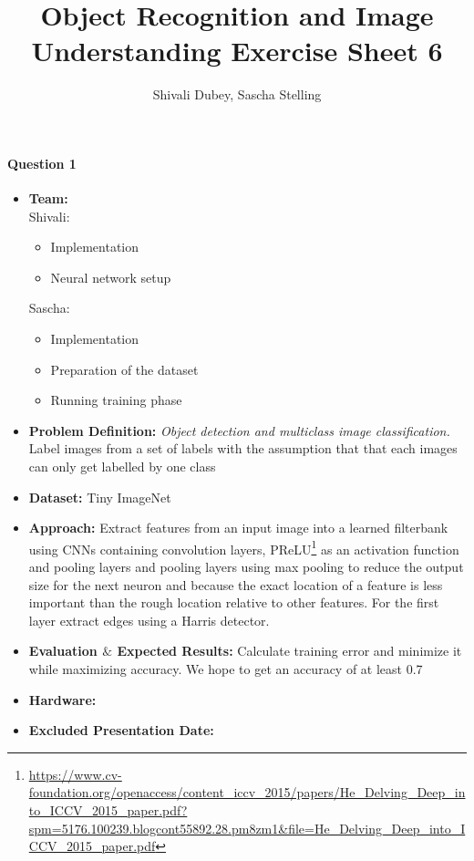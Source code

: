 \documentclass[10pt,a4]{article}
\author{Shivali Dubey, Sascha Stelling}
\title{Object Recognition and Image Understanding Exercise Sheet 6}
\begin{document}
\maketitle

\paragraph{Question 1}
\begin{itemize}
	\item \textbf{Team:} \\Shivali:
	\begin{itemize}
		\item Implementation
		\item Neural network setup
	\end{itemize}
	Sascha:
	\begin{itemize}
		\item Implementation
		\item Preparation of the dataset
		\item Running training phase
	\end{itemize}
	\item \textbf{Problem Definition:} \textit{Object detection and multiclass image classification.}
	\\Label images from a set of labels with the assumption that that each images can only get labelled by one class
	\item \textbf{Dataset:} Tiny ImageNet
	\item \textbf{Approach:} Extract features from an input image into a learned filterbank using CNNs containing convolution layers,  PReLU\footnote{\url{https://www.cv-foundation.org/openaccess/content_iccv_2015/papers/He_Delving_Deep_into_ICCV_2015_paper.pdf?spm=5176.100239.blogcont55892.28.pm8zm1&file=He_Delving_Deep_into_ICCV_2015_paper.pdf}} as an activation function and pooling layers and pooling layers using max pooling to reduce the output size for the next neuron and because the exact location of a feature is less important than the rough location relative to other features. 
	For the first layer extract edges using a Harris detector.
	\item \textbf{Evaluation $\mathbf{\&}$ Expected  Results:} Calculate training error and minimize it while maximizing accuracy. We hope to get an accuracy of at least 0.7
	\item \textbf{Hardware:}
	\item \textbf{Excluded Presentation Date:}	
\end{itemize}
\end{document}
